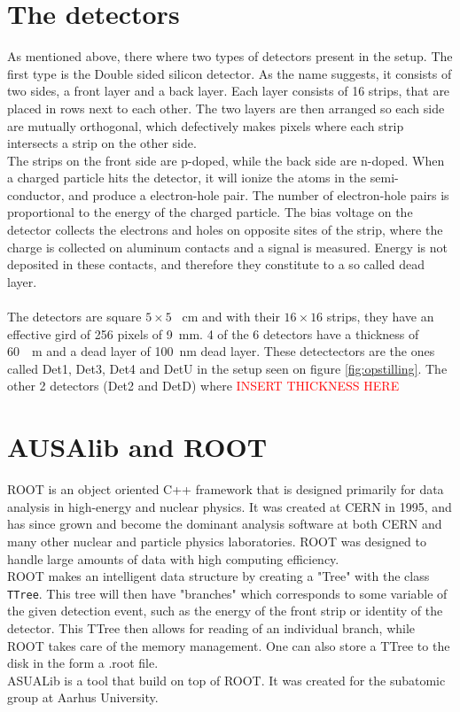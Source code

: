 \section{The detectors}
As mentioned above, there where two types of detectors present in the setup. The first type is the Double sided silicon detector. 
As the name suggests, it consists of two sides, a front layer and a back layer. Each layer consists of 16 strips, that are placed in rows next to each other. The two layers are then arranged so each side are mutually orthogonal, which defectively makes pixels where each strip intersects a strip on the other side. \\
The strips on the front side are p-doped, while the back side are n-doped. When a charged particle hits the detector, it will ionize the atoms in the semi-conductor, and produce a electron-hole pair. The number of electron-hole pairs is proportional to the energy of the charged particle. 
The bias voltage on the detector collects the electrons and holes on opposite sites of the strip, where the charge is collected on aluminum contacts and a signal is measured. Energy is not deposited in these contacts, and therefore they constitute to a so called dead layer. \\
\\
The detectors are square $5\times 5$ \SI{}{cm} and with their $16\times 16$ strips, they have an effective gird of  256 pixels of \SI{9}{mm}. 
4 of the 6 detectors have a thickness of \SI{60}{\mu m} and a dead layer of \SI{100}{nm} dead layer. These detectectors are the ones called Det1, Det3, Det4 and DetU in the setup seen on figure \ref{fig:opstilling}. The other 2 detectors (Det2 and DetD) where \textcolor{red}{INSERT THICKNESS HERE}

\section{AUSAlib and ROOT}
ROOT is an object oriented C++ framework that is designed primarily for data analysis in high-energy and nuclear physics. It was created at CERN in 1995, and has since grown and become the dominant analysis software at both CERN and many other nuclear and particle physics laboratories. 
ROOT was designed to handle large amounts of data with high computing efficiency. \\
ROOT makes an intelligent data structure by creating a "Tree" with the class \texttt{TTree}. This tree will then have "branches" which corresponds to some variable of the given detection event, such as the energy of the front strip or identity of the detector. This TTree then allows for reading of an individual branch, while ROOT takes care of the memory management. One can also store a TTree to the disk in the form a .root file. \\

ASUALib is a tool that build on top of ROOT. It was created for the subatomic group at Aarhus University.

